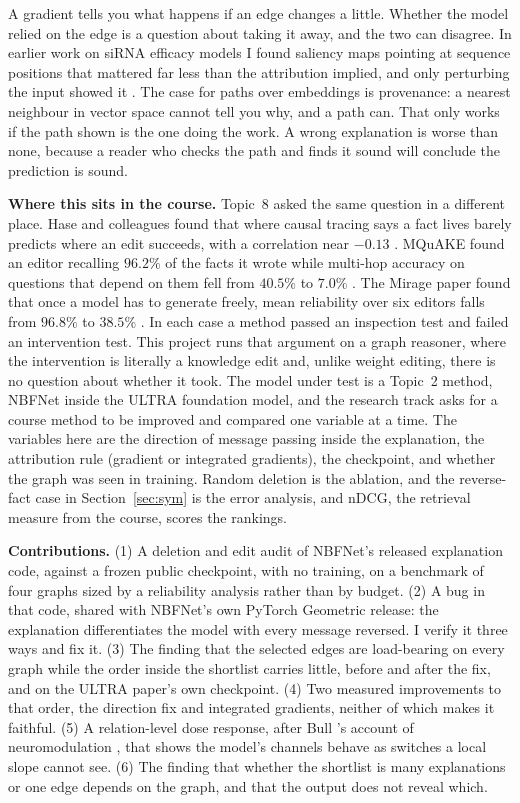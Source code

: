 \documentclass[10pt,twocolumn,letterpaper]{article}
\begin{document}
A gradient tells you what happens if an edge changes a little. Whether the
model relied on the edge is a question about taking it away, and the two can
disagree. In earlier work on siRNA efficacy models I found saliency maps
pointing at sequence positions that mattered far less than the attribution
implied, and only perturbing the input showed it \cite{sirna}. The case for
paths over embeddings is provenance: a nearest neighbour in vector space
cannot tell you why, and a path can. That only works if the path shown is the
one doing the work. A wrong explanation is worse than none, because a reader
who checks the path and finds it sound will conclude the prediction is sound.

\textbf{Where this sits in the course.} Topic~8 asked the same question in a
different place. Hase and colleagues found that where causal tracing says a
fact lives barely predicts where an edit succeeds, with a correlation near
\(-0.13\) \cite{hase}. MQuAKE found an editor recalling \(96.2\%\) of the facts
it wrote while multi-hop accuracy on questions that depend on them fell from
\(40.5\%\) to \(7.0\%\) \cite{mquake}. The Mirage paper found that once a
model has to generate freely, mean reliability over six editors falls from
\(96.8\%\) to \(38.5\%\) \cite{mirage}. In each case a method passed an
inspection test and failed an intervention test. This project runs that
argument on a graph reasoner, where the intervention is literally a knowledge
edit and, unlike weight editing, there is no question about whether it took.
The model under test is a Topic~2 method, NBFNet inside the ULTRA foundation
model, and the research track asks for a course method to be improved and
compared one variable at a time. The variables here are the direction of
message passing inside the explanation, the attribution rule (gradient or
integrated gradients), the checkpoint, and whether the graph was seen in
training. Random deletion is the ablation, and the reverse-fact case in
Section~\ref{sec:sym} is the error analysis, and nDCG, the retrieval measure
from the course, scores the rankings.

\textbf{Contributions.} (1) A deletion and edit audit of NBFNet's released
explanation code, against a frozen public checkpoint, with no training, on a
benchmark of four graphs sized by a reliability analysis rather than by
budget. (2) A bug in that code, shared with NBFNet's own PyTorch Geometric
release: the explanation differentiates the model with every message
reversed. I verify it three ways and fix it. (3) The finding that
the selected edges are load-bearing on every graph while the order inside the
shortlist carries little, before and after the fix, and on the ULTRA paper's
own checkpoint. (4) Two measured improvements to that order, the direction fix
and integrated gradients, neither of which makes it faithful. (5) A
relation-level dose response, after Bull \etal's account of neuromodulation
\cite{bull2025volume}, that shows the model's channels behave as switches a
local slope cannot see. (6) The finding that whether the shortlist is many
explanations or one edge depends on the graph, and that the output does not
reveal which.
\end{document}
